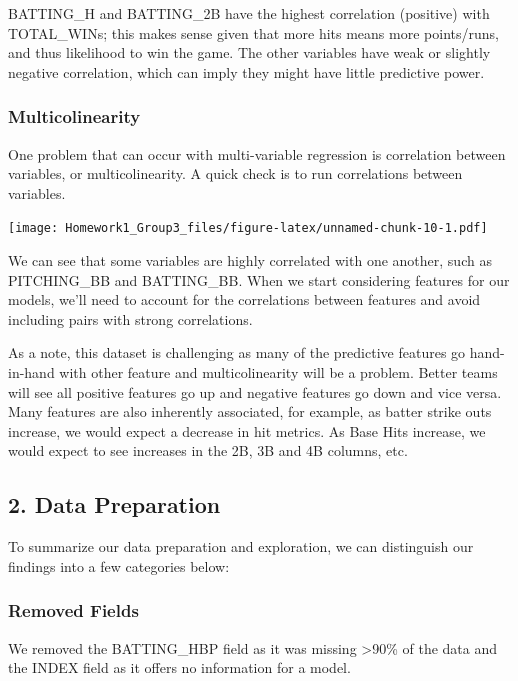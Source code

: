 \documentclass[
]{article}
\begin{document}
BATTING\_H and BATTING\_2B have the highest correlation (positive) with
TOTAL\_WINs; this makes sense given that more hits means more
points/runs, and thus likelihood to win the game. The other variables
have weak or slightly negative correlation, which can imply they might
have little predictive power.

\hypertarget{multicolinearity}{%
\subsubsection{Multicolinearity}\label{multicolinearity}}

One problem that can occur with multi-variable regression is correlation
between variables, or multicolinearity. A quick check is to run
correlations between variables.

\texttt{[image: Homework1\_Group3\_files/figure-latex/unnamed-chunk-10-1.pdf]}

We can see that some variables are highly correlated with one another,
such as PITCHING\_BB and BATTING\_BB. When we start considering features
for our models, we'll need to account for the correlations between
features and avoid including pairs with strong correlations.

As a note, this dataset is challenging as many of the predictive
features go hand-in-hand with other feature and multicolinearity will be
a problem. Better teams will see all positive features go up and
negative features go down and vice versa. Many features are also
inherently associated, for example, as batter strike outs increase, we
would expect a decrease in hit metrics. As Base Hits increase, we would
expect to see increases in the 2B, 3B and 4B columns, etc.

\hypertarget{data-preparation}{%
\subsection{2. Data Preparation}\label{data-preparation}}

To summarize our data preparation and exploration, we can distinguish
our findings into a few categories below:

\hypertarget{removed-fields}{%
\subsubsection{Removed Fields}\label{removed-fields}}

We removed the BATTING\_HBP field as it was missing \textgreater90\% of
the data and the INDEX field as it offers no information for a model.
\end{document}
